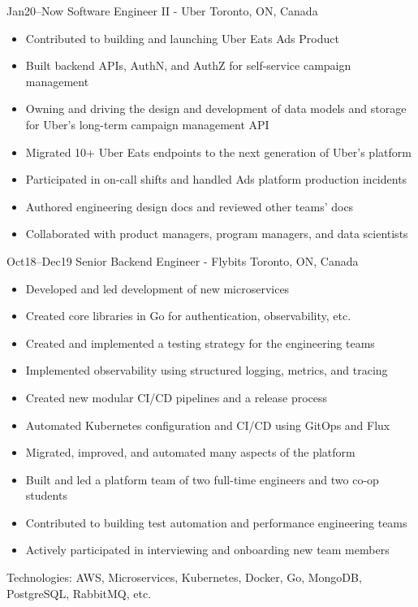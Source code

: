 \documentclass[]{cv-style}                     %
\begin{document}
\begin{entrylist}

  \entry
  {\small Jan20--Now}
  {Software Engineer II - Uber}
  {Toronto, ON, Canada}
  {
    \begin{itemize}
      \item Contributed to building and launching Uber Eats Ads Product
      \item Built backend APIs, AuthN, and AuthZ for self-service campaign management
      \item Owning and driving the design and development of data models and storage for Uber's long-term campaign management API
      \item Migrated 10+ Uber Eats endpoints to the next generation of Uber's platform
      \item Participated in on-call shifts and handled Ads platform production incidents
      \item Authored engineering design docs and reviewed other teams' docs
      \item Collaborated with product managers, program managers, and data scientists
    \end{itemize}
  }

  \entry
  {\small Oct18--Dec19}
  {Senior Backend Engineer - Flybits}
  {Toronto, ON, Canada}
  {
    \begin{itemize}
      \item Developed and led development of new microservices
      \item Created core libraries in Go for authentication, observability, etc.
      \item Created and implemented a testing strategy for the engineering teams
      \item Implemented observability using structured logging, metrics, and tracing
      \item Created new modular CI/CD pipelines and a release process
      \item Automated Kubernetes configuration and CI/CD using GitOps and Flux
      \item Migrated, improved, and automated many aspects of the platform
      \item Built and led a platform team of two full-time engineers and two co-op students
      \item Contributed to building test automation and performance engineering teams
      \item Actively participated in interviewing and onboarding new team members
    \end{itemize}
    Technologies: AWS, Microservices, Kubernetes, Docker, Go, MongoDB, PostgreSQL, RabbitMQ, etc.
  }


\end{entrylist}
\end{document}
